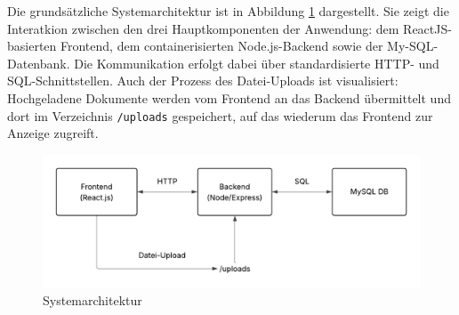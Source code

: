Die grundsätzliche Systemarchitektur ist in Abbildung \ref{fig:systemarchitektur} dargestellt. Sie zeigt die Interatkion zwischen den drei Hauptkomponenten der Anwendung: dem ReactJS-basierten Frontend, dem containerisierten Node.js-Backend sowie der My-SQL-Datenbank. Die Kommunikation erfolgt dabei über standardisierte HTTP- und SQL-Schnittstellen. Auch der Prozess des Datei-Uploads ist visualisiert: Hochgeladene Dokumente werden vom Frontend an das Backend übermittelt und dort im Verzeichnis \texttt{/uploads} gespeichert, auf das wiederum das Frontend zur Anzeige zugreift.
\begin{figure}[H]
  \centering
  \includegraphics[width=1\textwidth]{./images/systemarchitektur.png}
  \caption{Systemarchitektur}
  \label{fig:systemarchitektur}
\end{figure}
